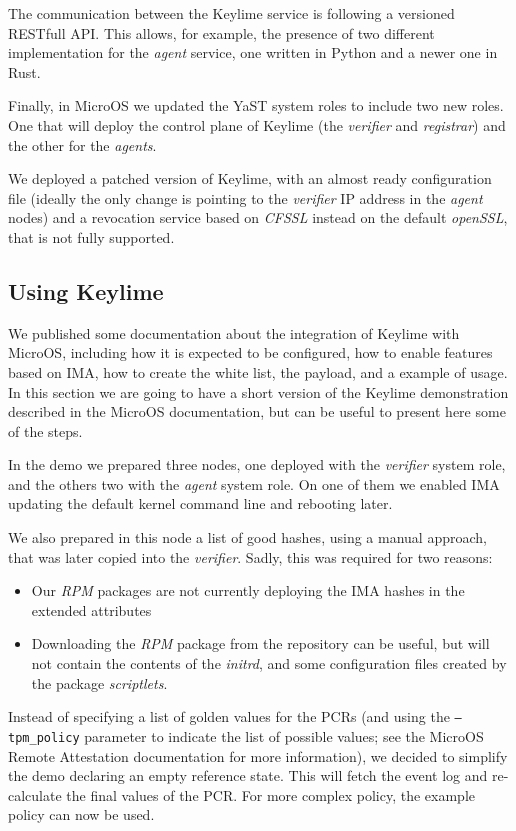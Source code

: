\documentclass{article}
\begin{document}
The communication between the Keylime service is following a versioned
RESTfull API.  This allows, for example, the presence of two different
implementation for the \emph{agent} service, one written in Python and
a newer one in Rust.

Finally, in MicroOS we updated the YaST system roles to include two
new roles.  One that will deploy the control plane of Keylime (the
\emph{verifier} and \emph{registrar}) and the other for the
\emph{agents}.

We deployed a patched version of Keylime, with an almost ready
configuration file (ideally the only change is pointing to the
\emph{verifier} IP address in the \emph{agent} nodes) and a revocation
service based on \emph{CFSSL} instead on the default \emph{openSSL},
that is not fully supported.

\subsection{Using Keylime}
We published some documentation about the integration of Keylime with
MicroOS\cite{microosra}, including how it is expected to be
configured, how to enable features based on IMA, how to create the
white list, the payload, and a example of usage.  In this section we
are going to have a short version of the Keylime demonstration
described in the MicroOS documentation, but can be useful to present
here some of the steps.

In the demo we prepared three nodes, one deployed with the
\emph{verifier} system role, and the others two with the \emph{agent}
system role.  On one of them we enabled IMA updating the default
kernel command line and rebooting later.

We also prepared in this node a list of good hashes, using a manual
approach, that was later copied into the \emph{verifier}.  Sadly, this
was required for two reasons:

\begin{itemize}
\item Our \emph{RPM} packages are not currently deploying the IMA
  hashes in the extended attributes
\item Downloading the \emph{RPM} package from the repository can be
  useful, but will not contain the contents of the \emph{initrd}, and
  some configuration files created by the package \emph{scriptlets}.
\end{itemize}

Instead of specifying a list of golden values for the PCRs (and using
the \texttt{--tpm\_policy} parameter to indicate the list of possible
values; see the MicroOS Remote Attestation documentation for more
information), we decided to simplify the demo declaring an empty
reference state.  This will fetch the event log and re-calculate the
final values of the PCR.  For more complex policy, the example policy
can now be used\cite{examplepolicy}.
\end{document}
